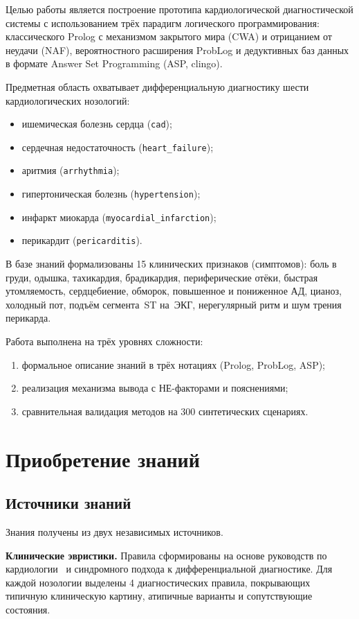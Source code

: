 \documentclass[14pt,a4paper]{extarticle}
\begin{document}
Целью работы является построение прототипа кардиологической диагностической системы с использованием трёх парадигм логического программирования: классического Prolog с механизмом закрытого мира (CWA) и отрицанием от неудачи (NAF), вероятностного расширения ProbLog и дедуктивных баз данных в формате Answer Set Programming (ASP, clingo).

Предметная область охватывает дифференциальную диагностику шести кардиологических нозологий:
\begin{itemize}
  \item ишемическая болезнь сердца (\texttt{cad});
  \item сердечная недостаточность (\texttt{heart\_failure});
  \item аритмия (\texttt{arrhythmia});
  \item гипертоническая болезнь (\texttt{hypertension});
  \item инфаркт миокарда (\texttt{myocardial\_infarction});
  \item перикардит (\texttt{pericarditis}).
\end{itemize}

В базе знаний формализованы 15 клинических признаков (симптомов): боль в груди, одышка, тахикардия, брадикардия, периферические отёки, быстрая утомляемость, сердцебиение, обморок, повышенное и пониженное АД, цианоз, холодный пот, подъём сегмента~ST на~ЭКГ, нерегулярный ритм и шум трения перикарда.

Работа выполнена на трёх уровнях сложности:
\begin{enumerate}
  \item формальное описание знаний в трёх нотациях (Prolog, ProbLog, ASP);
  \item реализация механизма вывода с НЕ-факторами и пояснениями;
  \item сравнительная валидация методов на 300 синтетических сценариях.
\end{enumerate}

\section{Приобретение знаний}

\subsection{Источники знаний}

Знания получены из двух независимых источников.

\textbf{Клинические эвристики.} Правила сформированы на основе руководств по кардиологии~\cite{bib:cardio2021} и синдромного подхода к дифференциальной диагностике. Для каждой нозологии выделены 4 диагностических правила, покрывающих типичную клиническую картину, атипичные варианты и сопутствующие состояния.
\end{document}
